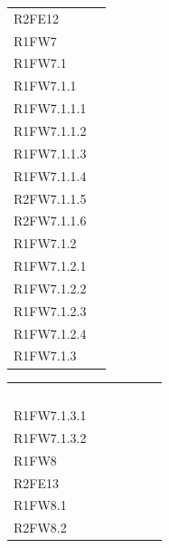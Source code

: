 \begin{table}[!htbp]
\begin{tabular}[t]{ m{}<{\centering}  m{}<{\centering} }
	R2FE12 & \Ns \\			
	 
	R1FW7 & \So \\	
	
	R1FW7.1 & \So \\

	R1FW7.1.1 & \So \\

	R1FW7.1.1.1 & \So \\

	R1FW7.1.1.2 & \So \\
	
	R1FW7.1.1.3 & \So \\

	R1FW7.1.1.4 & \So \\
	
	R2FW7.1.1.5 & \Ns \\		
	
	R2FW7.1.1.6 & \Ns \\

	R1FW7.1.2 & \So \\
	
	R1FW7.1.2.1 & \So \\
	
	R1FW7.1.2.2 & \So \\
	
	R1FW7.1.2.3 & \So \\
	
	R1FW7.1.2.4 & \So \\
	
	R1FW7.1.3 & \So \\		

\end{tabular}
\begin{tabular}[t]{ m{}<{\centering}  m{}<{\centering} }
	\rowcolor{darkblue}
	\textcolor{white}{\textbf{Fonte}} &\textcolor{white}{\textbf{Requisiti}}\\ 	

	R1FW7.1.3.1 & \So \\
	
	R1FW7.1.3.2 & \So \\
	
	R1FW8 & \Ns \\		
	
	R2FE13 & \Ns \\	
	 
	R1FW8.1 & \Ns \\	
	
	R2FW8.2 & \Ns \\	 
	 

\end{tabular}
\end{table}
